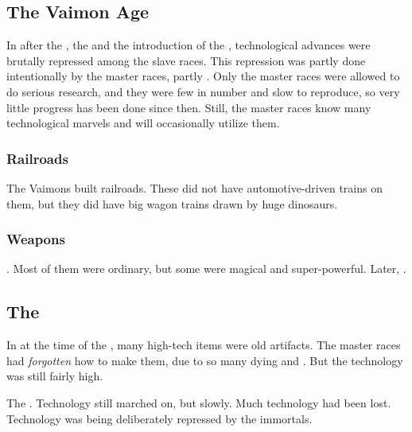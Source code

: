 \subsection{The Vaimon Age}
In \Azmith after the , the  and the introduction of the \charade, technological advances were brutally repressed among the slave races. 
This repression was partly done intentionally by the master races, partly .
Only the master races were allowed to do serious research, and they were few in number and slow to reproduce, so very little progress has been done since then. 
Still, the master races know many technological marvels and will occasionally utilize them. 





\subsubsection{Railroads}
The Vaimons built railroads. 
These did not have automotive-driven trains on them, but they did have big wagon trains drawn by huge dinosaurs.





\subsubsection{Weapons}
. 
Most of them were ordinary, but some were magical and super-powerful. 
Later, . 









\subsection{The \Thirdbanewar}
In \Azmith at the time of the , many high-tech items were old artifacts. 
The master races had \emph{forgotten} how to make them, due to so many dying and . 
But the technology was still fairly high. 

The . 
Technology still marched on, but slowly.
Much technology had been lost. 
Technology was being deliberately repressed by the immortals. 





